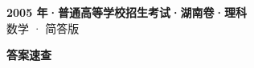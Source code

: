 \documentclass[zihao=-4, a4paper]{ctexart}
\begin{document}
\begin{center}
  {\Large\bfseries 2005 年·普通高等学校招生考试·湖南卷·理科}\\[4pt]
  {\large 数学 · 简答版}
\end{center}
\medskip
{}

\clearpage
{}
\begin{center}{\Large\bfseries 答案速查}\end{center}
\medskip

\end{document}
